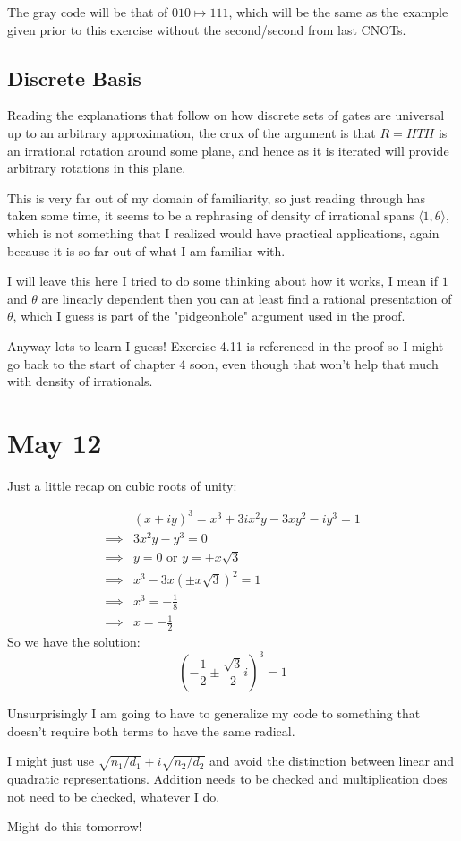 \documentclass[]{article}
\begin{document}
The gray code will be that of $010 \mapsto 111$, which will be the same as the example given prior to this exercise without the second/second from last CNOTs.

\subsection{Discrete Basis}

Reading the explanations that follow on how discrete sets of gates are universal up to an arbitrary approximation, the crux of the argument is that $R = HTH$ is an irrational rotation around some plane, and hence as it is iterated will provide arbitrary rotations in this plane.

This is very far out of my domain of familiarity, so just reading through has taken some time, it seems to be a rephrasing of density of irrational spans $\langle 1, \theta \rangle$, which is not something that I realized would have practical applications, again because it is so far out of what I am familiar with.

I will leave this here I tried to do some thinking about how it works, I mean if $1$ and $\theta$ are linearly dependent then you can at least find a rational presentation of $\theta$, which I guess is part of the "pidgeonhole" argument used in the proof.

Anyway lots to learn I guess! Exercise 4.11 is referenced in the proof so I might go back to the start of chapter 4 soon, even though that won't help that much with density of irrationals.

\section{May 12}
Just a little recap on cubic roots of unity:

\begin{align*}
&(x+iy)^3 = x^3 + 3ix^2y - 3xy^2 -iy^3 = 1
\\\implies& 3x^2y - y^3 = 0
\\\implies& y = 0 \text{\ or\ } y = \pm x\sqrt{3}
\\\implies& x^3 - 3x(\pm x\sqrt{3})^2 = 1
\\\implies& x^3 = -\frac{1}{8}
\\\implies& x = -\frac{1}{2}
\end{align*}
So we have the solution:
\[\left(-\frac{1}{2} \pm \frac{\sqrt{3}}{2}i\right)^3 = 1\]

Unsurprisingly I am going to have to generalize my code to something that doesn't require both terms to have the same radical.

I might just use $\sqrt{n_1/d_1} + i\sqrt{n_2/d_2}$ and avoid the distinction between linear and quadratic representations. Addition needs to be checked and multiplication does not need to be checked, whatever I do.

Might do this tomorrow!
\end{document}
